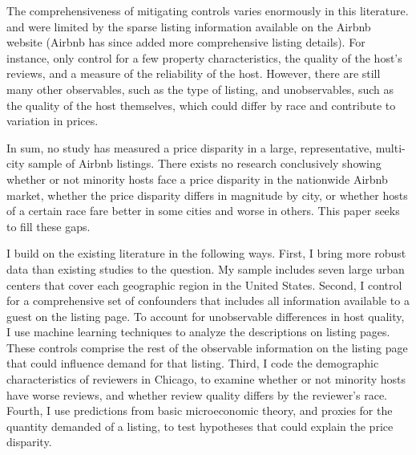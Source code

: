 The comprehensiveness of mitigating controls varies enormously in this literature. \cite{wang} and \cite{edelman} were limited by the sparse listing information available on the Airbnb website (Airbnb has since added more comprehensive listing details). For instance, \cite{edelman} only control for a few property characteristics, the quality of the host's reviews, and a measure of the reliability of the host. However, there are still many other observables, such as the type of listing, and unobservables, such as the quality of the host themselves, which could differ by race and contribute to variation in prices.

In sum, no study has measured a price disparity in a large, representative, multi-city sample of Airbnb listings. There exists no research conclusively showing whether or not minority hosts face a price disparity in the nationwide Airbnb market, whether the price disparity differs in magnitude by city, or whether hosts of a certain race fare better in some cities and worse in others. This paper seeks to fill these gaps. 

I build on the existing literature in the following ways. First, I bring more robust data than existing studies to the question. My sample includes seven large urban centers that cover each geographic region in the United States. Second, I control for a comprehensive set of confounders that includes all information available to a guest on the listing page. To account for unobservable differences in host quality, I use machine learning techniques to analyze the descriptions on listing pages. These controls comprise the rest of the observable information on the listing page that could influence demand for that listing. Third, I code the demographic characteristics of reviewers in Chicago, to examine whether or not minority hosts have worse reviews, and whether review quality differs by the reviewer's race. Fourth, I use predictions from basic microeconomic theory, and proxies for the quantity demanded of a listing, to test hypotheses that could explain the price disparity. 

